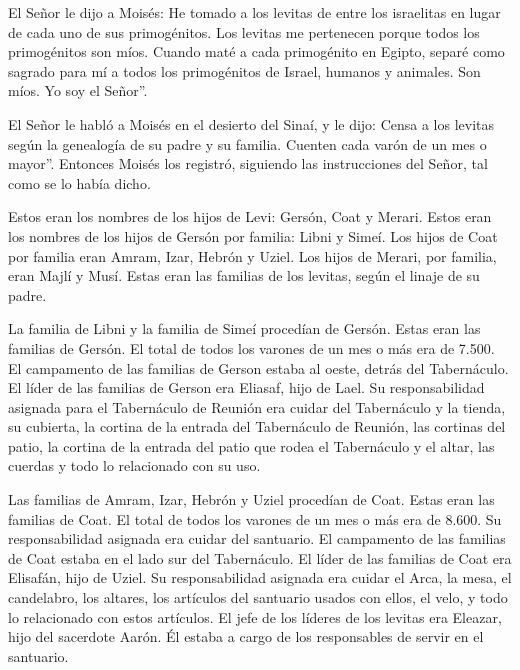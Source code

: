  El Señor le dijo a Moisés:  He tomado a los
levitas de entre los israelitas en lugar de cada uno de sus
primogénitos. Los levitas me pertenecen  porque todos los
primogénitos son míos. Cuando maté a cada primogénito en Egipto, separé
como sagrado para mí a todos los primogénitos de Israel, humanos y
animales. Son míos. Yo soy el Señor''.

 El Señor le habló a Moisés en el desierto del Sinaí, y le
dijo:  Censa a los levitas según la genealogía de su padre
y su familia. Cuenten cada varón de un mes o mayor''. 
Entonces Moisés los registró, siguiendo las instrucciones del Señor, tal
como se lo había dicho.

 Estos eran los nombres de los hijos de Levi: Gersón, Coat
y Merari.  Estos eran los nombres de los hijos de Gersón
por familia: Libni y Simeí.  Los hijos de Coat por familia
eran Amram, Izar, Hebrón y Uziel.  Los hijos de Merari, por
familia, eran Majlí y Musí. Estas eran las familias de los levitas,
según el linaje de su padre.

 La familia de Libni y la familia de Simeí procedían de
Gersón. Estas eran las familias de Gersón.  El total de
todos los varones de un mes o más era de 7.500.  El
campamento de las familias de Gerson estaba al oeste, detrás del
Tabernáculo.  El líder de las familias de Gerson era
Eliasaf, hijo de Lael.  Su responsabilidad asignada para el
Tabernáculo de Reunión era cuidar del Tabernáculo y la tienda, su
cubierta, la cortina de la entrada del Tabernáculo de Reunión,
 las cortinas del patio, la cortina de la entrada del patio
que rodea el Tabernáculo y el altar, las cuerdas y todo lo relacionado
con su uso.

 Las familias de Amram, Izar, Hebrón y Uziel procedían de
Coat. Estas eran las familias de Coat.  El total de todos
los varones de un mes o más era de 8.600. Su responsabilidad asignada
era cuidar del santuario.  El campamento de las familias de
Coat estaba en el lado sur del Tabernáculo.  El líder de
las familias de Coat era Elisafán, hijo de Uziel.  Su
responsabilidad asignada era cuidar el Arca, la mesa, el candelabro, los
altares, los artículos del santuario usados con ellos, el velo, y todo
lo relacionado con estos artículos.  El jefe de los líderes
de los levitas era Eleazar, hijo del sacerdote Aarón. Él estaba a cargo
de los responsables de servir en el santuario.

